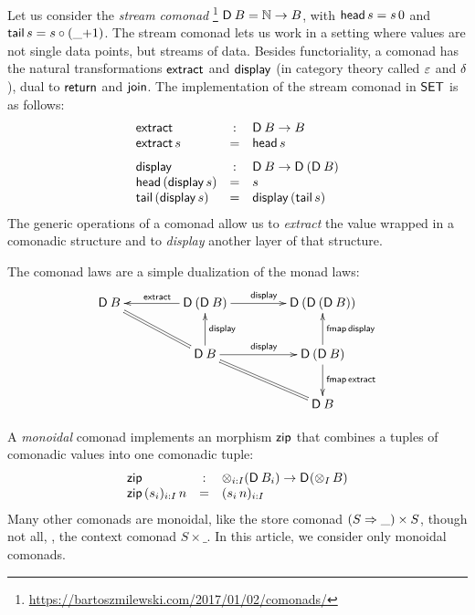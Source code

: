 \documentclass[acmsmall,review,anonymous]{acmart}\settopmatter{printfolios=true,printccs=false,printacmref=false}
\begin{document}
Let us consider the \emph{stream comonad}%
\footnote{\url{https://bartoszmilewski.com/2017/01/02/comonads/}}
$\mathsf{D}_{}\,B = \mathbb{N} \to B$,
with $\mathsf{head}\,s = s\,0$ and $\mathsf{tail}\,s = s \circ (\_{+}1)$.
The stream comonad lets us work in a setting where values are not
single data points, but streams of data.
Besides functoriality, a
comonad has the natural transformations $\mathsf{extract}$ and $\mathsf{display}_{}$
(in category theory called $\varepsilon$ and $\delta$),
dual to $\mathsf{return}$ and $\mathsf{join}$.  The implementation of the stream
comonad in $\mathsf{SET}$ is as follows:
\[
\begin{array}{lcl}
  \mathsf{extract} & : & \mathsf{D}_{}\,B \to B \\
  \mathsf{extract}\,s & = & \mathsf{head}\,s
\\[1.5ex]
  \mathsf{display} & : & \mathsf{D}_{}\,B \to \mathsf{D}_{}\,(\mathsf{D}_{}\,B) \\
  \mathsf{head}\,(\mathsf{display}\,s) & = & s \\
  \mathsf{tail}\,(\mathsf{display}\,s) & = & \mathsf{display}\,(\mathsf{tail}\,s) \\
\end{array}
\]
The generic operations of a comonad allow us to \emph{extract} the
value wrapped in a comonadic structure and to \emph{display} another
layer of that structure.

The comonad laws are a simple dualization of the monad laws:
\[
\xymatrix@C=10ex{
\D\,B  \ar@{=}[dr]
  & \D\,(\D\,B) \ar[l]_{\textract} \ar[r]^{\tdisplay}
  & \D\,(\D\,(\D\,B))
\\
  & \D\,B \ar[u]_{\tdisplay} \ar[r]^{\tdisplay} \ar@{=}[dr]
  & \D\,(\D\,B) \ar[u]_{\tfmap\,\tdisplay} \ar[d]^{\tfmap\,\textract}
\\
  &
  & \D\,B
}
\]

A \emph{monoidal} comonad implements an morphism $\mathsf{zip}$ that combines
a tuples of comonadic values into one comonadic tuple:
\[
\begin{array}{lcl}
  \mathsf{zip} & : & \mathop\otimes_{i:I} (\mathsf{D}_{}\,B_i) \to \mathsf{D}_{}(\mathop\otimes_{I} B) \\
  \mathsf{zip}\,(s_i)_{i:I}\,n & = & (s_i\,n)_{i:I} \\
\end{array}
\]
Many other comonads are monoidal,
like the store comonad $(S \Rightarrow \_) \times S$,
though not all, \eg, the context comonad $S{\times}\_$.
In this article, we consider only monoidal comonads.
\end{document}
